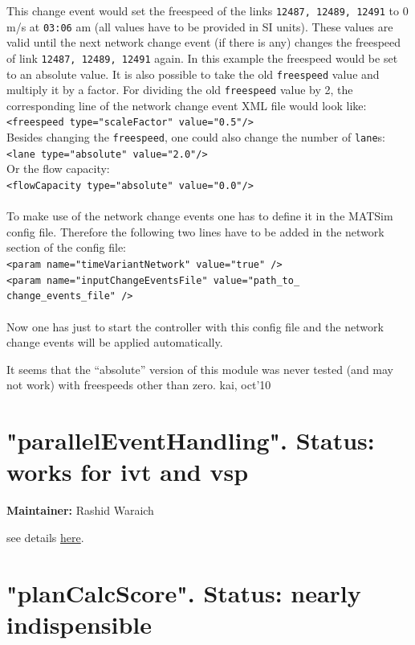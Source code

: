 This change event would set the freespeed of the links 
\texttt{12487, 12489, 12491} to 0 m/s at 
\texttt{03:06}  am (all values have to be provided in SI units). These values are valid  until the next network change event (if there is any) changes the  freespeed of link 
\texttt{12487, 12489, 12491} again. In this example the freespeed would be set to an absolute value. It is also possible to take the old 
\texttt{freespeed} value and multiply it by a factor. For dividing the old 
\texttt{freespeed} value by 2, the corresponding line of the network change event XML file would look like:
\\   
\texttt{<freespeed type="scaleFactor" value="0.5"/>}
\\  Besides changing the 
\texttt{freespeed}, one could also change the number of 
\texttt{lane}s:
\\   
\texttt{<lane type="absolute" value="2.0"/>}
\\  Or the flow capacity:
\\   
\texttt{<flowCapacity type="absolute" value="0.0"/>}
\\
\\  To make use of the network change events one has to define it in the  MATSim config file. Therefore the following two lines have to be added  in the network section of the config file:
\\
\texttt{<param name="timeVariantNetwork" value="true" />
\\  <param name="inputChangeEventsFile" value="path\_to\_ change\_events\_file" />}
\\
\\  Now one has just to start the controller with this config file and the network change events will be applied automatically.

It  seems that the ``absolute'' version of this module was never tested (and  may not work) with freespeeds other than zero. kai, oct'10



\vfill\eject
\section{"parallelEventHandling". Status: works for ivt and vsp}

\textbf{Maintainer:} Rashid Waraich

see details \href{http://matsim.org/node/238}{here}.



\vfill\eject
\section{"planCalcScore". Status: nearly indispensible}

